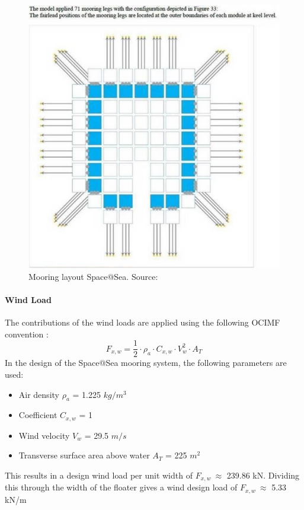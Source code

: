 \begin{figure}[h]
    \centering
    \includegraphics[width=0.5\linewidth]{figures/Costs/mooring_layout.PNG}
    \caption{Mooring layout Space@Sea. Source: \citep{S@S1.3}}
    \label{fig: mooring layout S@S}
\end{figure}



\paragraph{Wind Load}
The contributions of the wind loads are applied using the following \acrfull{OCIMF} convention \cite{D3.3space@sea}:
\begin{equation}
    F_{x,w} = \frac{1}{2} \cdot \rho_a \cdot C_{x,w} \cdot V_w^2 \cdot A_T
\end{equation}
In the design of the Space@Sea mooring system, the following parameters are used:
\begin{itemize}
    \item Air density $\rho_a$ = 1.225 $kg/m^3$
    \item Coefficient $C_{x,w}$ = 1
    \item Wind velocity $V_w$ = 29.5 $m/s$
    \item Transverse surface area above water $A_T$ = 225 $m^2$
\end{itemize}
This results in a design wind load per unit width of $F_{x,w}~\approx$ 239.86 kN. Dividing this through the width of the floater gives a wind design load of $F_{x,w}~\approx$ 5.33 kN/m

